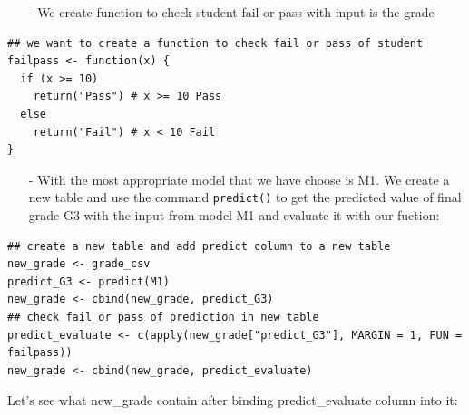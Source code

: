 \documentclass[a4paper]{article}
\numberwithin{equation}{section}
\begin{document}
\begin{itemize}
  \item[-] We create function to check student fail or pass with input is the grade
\end{itemize}

\begin{mdframed}[leftline=false,rightline=false,backgroundcolor=magenta!10,nobreak=true]
  \begin{verbatim}
## we want to create a function to check fail or pass of student
failpass <- function(x) {
  if (x >= 10)
    return("Pass") # x >= 10 Pass
  else
    return("Fail") # x < 10 Fail
}
  \end{verbatim}
\end{mdframed}

\begin{itemize}
  \item[-] With the most appropriate model that we have choose is M1. We create a new table and use the command \texttt{predict()} to get the predicted value of final grade G3 with the input from model M1 and evaluate it with our fuction:
\end{itemize}

\begin{mdframed}[leftline=false,rightline=false,backgroundcolor=magenta!10,nobreak=true]
  \begin{verbatim}
## create a new table and add predict column to a new table
new_grade <- grade_csv
predict_G3 <- predict(M1)
new_grade <- cbind(new_grade, predict_G3)
## check fail or pass of prediction in new table
predict_evaluate <- c(apply(new_grade["predict_G3"], MARGIN = 1, FUN = failpass))
new_grade <- cbind(new_grade, predict_evaluate)
  \end{verbatim}
\end{mdframed}

Let's see what new\_grade contain after binding predict\_evaluate column into it:

\begin{center}
\end{center}
\end{document}
